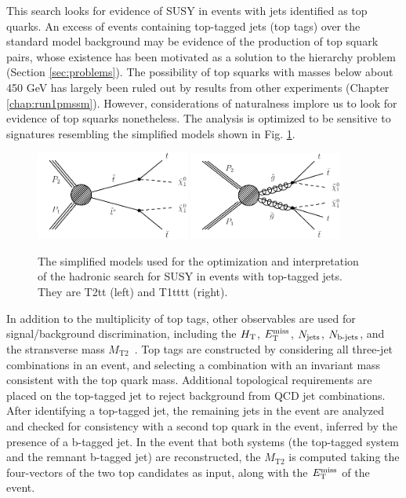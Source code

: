 This search \cite{CMS:2016nhb} looks for evidence of SUSY in events with jets identified as top quarks. An excess of events containing top-tagged jets (top tags) over the standard model background may be evidence of the production of top squark pairs, whose existence has been motivated as a solution to the hierarchy problem (Section \ref{sec:problems}).  The possibility of top squarks with masses below about 450 GeV has largely been ruled out by results from other experiments (Chapter \ref{chap:run1pmssm}).  However, considerations of naturalness implore us to look for evidence of top squarks nonetheless. The analysis is optimized to be sensitive to signatures resembling the simplified models shown in Fig. \ref{fig:hadstopSMS}.
\begin{figure}[h]
\centering
\includegraphics[width=0.45\textwidth]{figures/SusySearches/HadStop2015/T2tt.pdf}
\includegraphics[width=0.45\textwidth]{figures/SusySearches/HadStop2015/T1tttt.pdf}\\
\caption{
  The simplified models used for the optimization and interpretation of the hadronic search for SUSY in events with top-tagged jets. They are T2tt (left) and T1tttt (right).
}
\label{fig:hadstopSMS}
\end{figure}

In addition to the multiplicity of top tags, other observables are used for signal/background discrimination, including the $H_{\rm T}$, $E_{\text{T}}^{\rm miss}$, $N_{\rm jets}$, $N_{\text{b-jets}}$, and the stransverse mass $M_{\text{T2}}$~\cite{Lester:1999tx}. Top tags are constructed by considering all three-jet combinations in an event, and selecting a combination with an invariant mass consistent with the top quark mass. Additional topological requirements are placed on the top-tagged jet to reject background from QCD jet combinations. After identifying a top-tagged jet, the remaining jets in the event are analyzed and checked for consistency with a second top quark in the event, inferred by the presence of a b-tagged jet. In the event that both systems (the top-tagged system and the remnant b-tagged jet) are reconstructed, the $M_{\text{T2}}$ is computed taking the four-vectors of the two top candidates as input, along with the $E_{\text{T}}^{\rm miss}$ of the event. 

